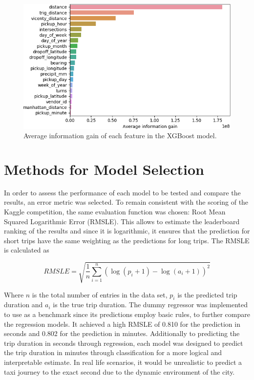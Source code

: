 \documentclass[a4paper]{article}
\begin{document}
\begin{figure}
    \centering
    \includegraphics[width=0.8\linewidth]{feature_importance_seaborn}
    \caption{Average information gain of each feature in the XGBoost model.}
    \label{information_gain}
\end{figure}

\section{Methods for Model Selection}
In order to assess the performance of each model to be tested and compare the
results, an error metric was selected. To remain consistent with the scoring of
the Kaggle competition, the same evaluation function was chosen: Root Mean
Squared Logarithmic Error (RMSLE). This allows to estimate the leaderboard
ranking of the results and since it is logarithmic, it ensures that the
prediction for short trips have the same weighting as the predictions for long
trips. The RMSLE is calculated as

\[RMSLE = \sqrt{\frac{1}{n}\sum_{i=1}^n(\log(p_i+1) - \log(a_i+1))^2}\]

Where $n$ is the total number of entries in the data set, $p_i$ is the predicted trip
duration and $a_i$ is the true trip duration.  The dummy regressor was implemented
to use as a benchmark since its predictions employ basic rules, to further
compare the regression models. It achieved a high RMSLE of 0.810 for the
prediction in seconds and 0.802 for the prediction in minutes.  Additionally to
predicting the trip duration in seconds through regression, each model was
designed to predict the trip duration in minutes through classification for a
more logical and interpretable estimate. In real life scenarios, it would be
unrealistic to predict a taxi journey to the exact second due to the dynamic
environment of the city.
\end{document}
